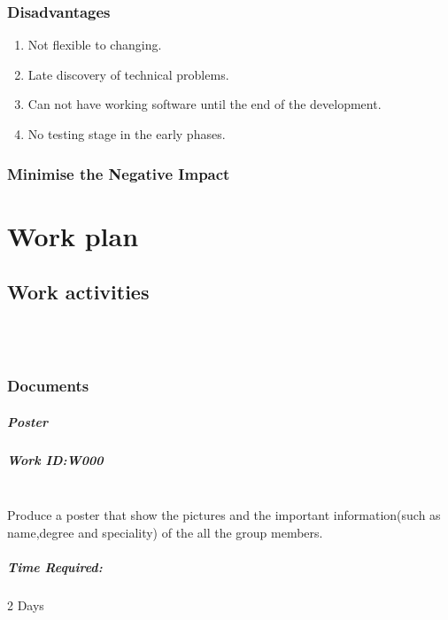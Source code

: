 \documentclass[11pt, a4paper]{report}
\begin{document}
\subsection{Disadvantages}
\begin{enumerate}
	\item  Not flexible to changing.
	\item  Late discovery of technical problems.
	\item  Can not have working software until the end of the development.
	\item  No testing stage in the early phases.
\end{enumerate}

\subsection{Minimise the Negative Impact}












\chapter{Work plan}



\section{Work activities}

\\
\\
\subsection{Documents}
\paragraph{Poster}
\paragraph{Work ID:W000}\\
Produce a poster that show the pictures and the important information(such as name,degree and speciality) of the all the group members.
\paragraph{Time Required:}2 Days
\end{document}
